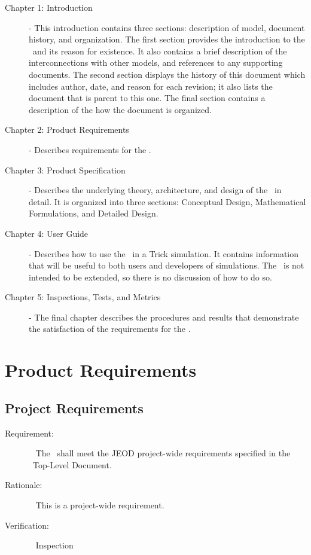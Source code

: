 \begin{description}

\item[Chapter 1: Introduction] - 
This introduction contains three sections: description of model, document history, and organization.  
The first section provides the introduction to the \SpiceDesc\ and its reason 
for existence.  It also contains a brief description of the interconnections with other models, and 
references to any supporting documents.  The second section displays the history of this document which includes
author, date, and reason for each revision; it also lists the document that is parent to this one.  The final
section contains a description of the how the document is organized.

\item[Chapter 2: Product Requirements] - 
Describes requirements for the \SpiceDesc.

\item[Chapter 3: Product Specification] - 
Describes the underlying theory, architecture, and design of the \SpiceDesc\ in detail.  It is organized into
three sections: Conceptual Design, Mathematical Formulations, and Detailed Design.

\item[Chapter 4: User Guide] - 
Describes how to use the \SpiceDesc\ in a Trick simulation.  It contains information that will be useful to
both users and developers of simulations. The \SpiceDesc\ is not intended to be extended, so there is no
discussion of how to do so.

\item[Chapter 5: Inspections, Tests, and Metrics] -  
The final chapter describes the procedures and results that demonstrate the satisfaction of the
requirements for the \SpiceDesc.

\end{description}


\chapter{Product Requirements}\label{ch:reqt}

\section{Project Requirements}
\label{reqt:toplevel}
\begin{description}
\item[Requirement:]\ \newline
  The \SpiceDesc\ shall meet the JEOD project-wide requirements specified in
  the \JEODid\ Top-Level Document.

\item[Rationale:]\ \newline
  This is a project-wide requirement.

\item[Verification:]\ \newline
  Inspection
\end{description}


